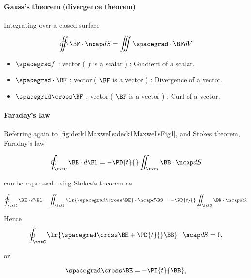 \paragraph{Gauss's theorem (divergence theorem)}

Integrating over a closed surface

\begin{dmath}\label{eqn:uwavesLecture1:160}
\oiint \BF \cdot \ncap dS = \iiint \spacegrad \cdot \BF dV
\end{dmath}

\begin{itemize}
\item \( \spacegrad f \) :  vector ( \( f \) is a scalar ) : Gradient of a scalar.
\item \( \spacegrad \cdot \BF \) :  vector ( \( \BF \) is a vector ) : Divergence of a vector.
\item \( \spacegrad \cross \BF \) :  vector ( \( \BF \) is a vector ) : Curl of a vector.
\end{itemize}

\paragraph{Faraday's law}

Referring again to \cref{fig:deck1Maxwells:deck1MaxwellsFig1}, and Stokes theorem, Faraday's law

\begin{dmath}\label{eqn:uwavesLecture1:180}
\oint_\txtC \BE \cdot d\Bl = - \PD{t}{} \iint_\txtS \BB \cdot \ncap dS
\end{dmath}

can be expressed using Stokes's theorem as

\begin{dmath}\label{eqn:uwavesLecture1:200}
\oint_\txtC \BE \cdot d\Bl = \iint_\txtS \lr{ \spacegrad \cross \BE} \cdot \ncap d\BS
=
- \PD{t}{} \iint_\txtS \BB \cdot \ncap dS.
\end{dmath}

Hence
\begin{dmath}\label{eqn:uwavesLecture1:220}
\oint_\txtC 
\lr{
\spacegrad \cross \BE
+ \PD{t}{} \BB 
}
\cdot \ncap dS
= 0,
\end{dmath}

or

\begin{dmath}\label{eqn:uwavesLecture1:240}
\spacegrad \cross \BE = -\PD{t}{\BB},
\end{dmath}

